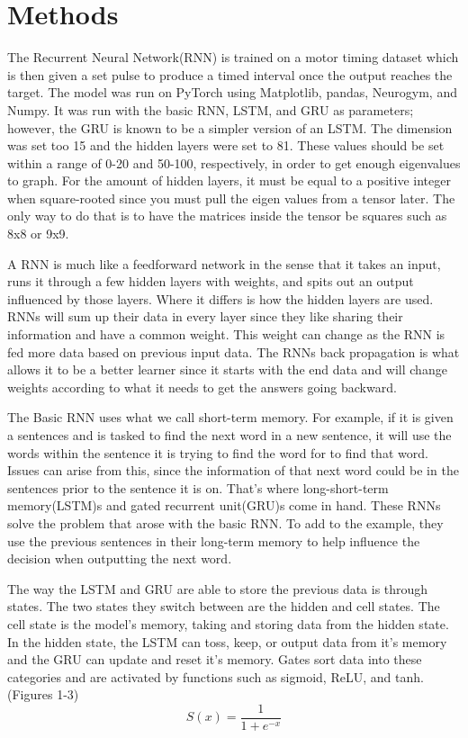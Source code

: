 \documentclass{article}
\begin{document}
\section{Methods\centering}
The Recurrent Neural Network(RNN) is trained on a motor timing dataset which is then given a set pulse to produce a timed interval once the output reaches the target. The model was run on PyTorch using Matplotlib, pandas, Neurogym, and Numpy. It was run with the basic RNN, LSTM, and GRU as parameters; however, the GRU is known to be a simpler version of an LSTM. The dimension was set too 15 and the hidden layers were set to 81. These values should be set within a range of 0-20 and 50-100, respectively, in order to get enough eigenvalues to graph. For the amount of hidden layers, it must be equal to a positive integer when square-rooted since you must pull the eigen values from a tensor later. The only way to do that is to have the matrices inside the tensor be squares such as 8x8 or 9x9.
\par
\noindent{}
A RNN is much like a feedforward network in the sense that it takes an input, runs it through a few hidden layers with weights, and spits out an output influenced by those layers. Where it differs is how the hidden layers are used. RNNs will sum up their data in every layer since they like sharing their information and have a common weight. This weight can change as the RNN is fed more data based on previous input data. The RNNs back propagation is what allows it to be a better learner since it starts with the end data and will change weights according to what it needs to get the answers going backward.
\par\noindent{}
The Basic RNN uses what we call short-term memory. For example, if it is given a sentences and is tasked to find the next word in a new sentence, it will use the words within the sentence it is trying to find the word for to find that word. Issues can arise from this, since the information of that next word could be in the sentences prior to the sentence it is on. That's where long-short-term memory(LSTM)s and gated recurrent unit(GRU)s come in hand. These RNNs solve the problem that arose with the basic RNN. To add to the example, they use the previous sentences in their long-term memory to help influence the decision when outputting the next word. 
\par\noindent{}
The way the LSTM and GRU are able to store the previous data is through states. The two states they switch between are the hidden and cell states. The cell state is the model's memory, taking and storing data from the hidden state. In the hidden state, the LSTM can toss, keep, or output data from it's memory and the GRU can update and reset it's memory. Gates sort data into these categories and are activated by functions such as sigmoid, ReLU, and tanh.(Figures 1-3) 
\[  S(x) =  \frac{\mathrm{1} }{\mathrm{1} + e^{-x} }\]
\end{document}
